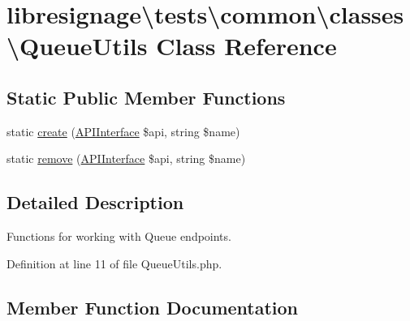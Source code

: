 \hypertarget{classlibresignage_1_1tests_1_1common_1_1classes_1_1QueueUtils}{}\section{libresignage\textbackslash{}tests\textbackslash{}common\textbackslash{}classes\textbackslash{}Queue\+Utils Class Reference}
\label{classlibresignage_1_1tests_1_1common_1_1classes_1_1QueueUtils}
\subsection*{Static Public Member Functions}
\begin{DoxyCompactItemize}
\item 
static \hyperlink{classlibresignage_1_1tests_1_1common_1_1classes_1_1QueueUtils_a0666deb1f7d790947038b48060a6af12}{create} (\hyperlink{classlibresignage_1_1tests_1_1common_1_1classes_1_1APIInterface}{A\+P\+I\+Interface} \$api, string \$name)
\item 
static \hyperlink{classlibresignage_1_1tests_1_1common_1_1classes_1_1QueueUtils_a5f0a78ad2d9b22d4ba16b641b6f1b5e6}{remove} (\hyperlink{classlibresignage_1_1tests_1_1common_1_1classes_1_1APIInterface}{A\+P\+I\+Interface} \$api, string \$name)
\end{DoxyCompactItemize}


\subsection{Detailed Description}
Functions for working with Queue endpoints. 

Definition at line 11 of file Queue\+Utils.\+php.



\subsection{Member Function Documentation}
\mbox{\label{classlibresignage_1_1tests_1_1common_1_1classes_1_1QueueUtils_a0666deb1f7d790947038b48060a6af12}} 
